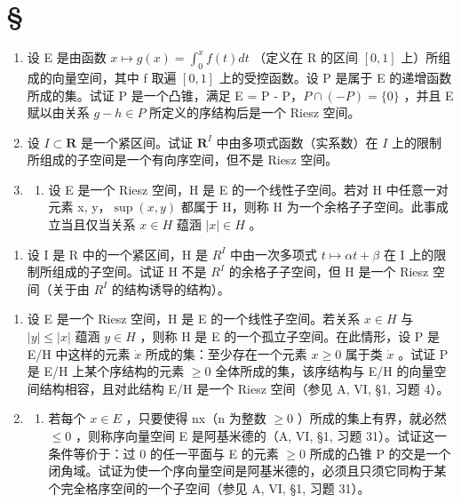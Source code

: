 \section*{\texorpdfstring{\S\CurrentExerciseGroup}{第{\CurrentExerciseGroup}节}}
{}

\begin{enumerate}
\def\labelenumi{\arabic{enumi})}
\item
  设 E 是由函数 \(x \mapsto g(x) = \int_{0}^{x} f(t) dt\) （定义在 R 的区间 \([0,1]\) 上）所组成的向量空间，其中 f 取遍 \([0,1]\) 上的受控函数。设 P 是属于 E 的递增函数所成的集。试证 P 是一个凸锥，满足 E = P - P，\(P \cap (-P) = \{0\}\) ，并且 E 赋以由关系 \(g - h \in P\) 所定义的序结构后是一个 Riesz 空间。
\item
  设 \(I \subset \mathbf{R}\) 是一个紧区间。试证 \(\mathbf{R}^I\) 中由多项式函数（实系数）在 \(I\) 上的限制所组成的子空间是一个有向序空间，但不是 Riesz 空间。
\item
  \begin{enumerate}
  \def\labelenumii{\alph{enumii})}
  \tightlist
  \item
    设 E 是一个 Riesz 空间，H 是 E 的一个线性子空间。若对 H 中任意一对元素 x, y，\(\sup(x,y)\) 都属于 H，则称 H 为一个余格子子空间。此事成立当且仅当关系 \(x \in H\) 蕴涵 \(|x| \in H\) 。
  \end{enumerate}
\end{enumerate}

\begin{enumerate}
\def\labelenumi{\alph{enumi})}
\setcounter{enumi}{1}
\tightlist
\item
  设 I 是 R 中的一个紧区间，H 是 \(R^{I}\) 中由一次多项式 \(t \mapsto \alpha t + \beta\) 在 I 上的限制所组成的子空间。试证 H 不是 \(R^{I}\) 的余格子子空间，但 H 是一个 Riesz 空间（关于由 \(R^{I}\) 的结构诱导的结构）。
\end{enumerate}

\begin{enumerate}
\def\labelenumi{\arabic{enumi})}
\setcounter{enumi}{3}
\item
  设 E 是一个 Riesz 空间，H 是 E 的一个线性子空间。若关系 \(x \in H\) 与 \(|y| \leqslant |x|\) 蕴涵 \(y \in H\) ，则称 H 是 E 的一个孤立子空间。在此情形，设 P 是 E/H 中这样的元素 \(\dot{x}\) 所成的集：至少存在一个元素 \(x \geqslant 0\) 属于类 \(\dot{x}\) 。试证 P 是 E/H 上某个序结构的元素 \(\geqslant 0\) 全体所成的集，该序结构与 E/H 的向量空间结构相容，且对此结构 E/H 是一个 Riesz 空间（参见 A, VI, §1, 习题 4）。
\item
  \begin{enumerate}
  \def\labelenumii{\alph{enumii})}
  \tightlist
  \item
    若每个 \(x \in E\) ，只要使得 nx（n 为整数 \(\geqslant 0\) ）所成的集上有界，就必然 \(\leqslant 0\) ，则称序向量空间 E 是阿基米德的（A, VI, §1, 习题 31）。试证这一条件等价于：过 0 的任一平面与 E 的元素 \(\geqslant 0\) 所成的凸锥 P 的交是一个闭角域。试证为使一个序向量空间是阿基米德的，必须且只须它同构于某个完全格序空间的一个子空间（参见 A, VI, §1, 习题 31）。
  \end{enumerate}
\end{enumerate}

